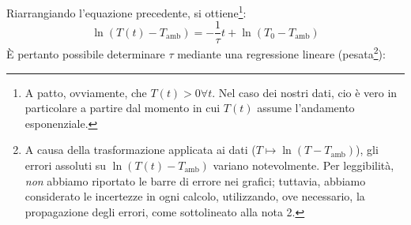 \documentclass{article}
\begin{document}
Riarrangiando l'equazione precedente, si ottiene\footnote{
    A patto, ovviamente, che $T(t) > 0 \forall t$.
    Nel caso dei nostri dati, cio è vero in particolare
    a partire dal momento in cui $T(t)$ assume l'andamento
    esponenziale.
}:
\[
    \ln(T(t) - T_\text{amb}) = -\frac{1}{\tau} t + \ln(T_0 - T_\text{amb})
\]
È pertanto possibile determinare $\tau$ mediante una regressione lineare (pesata\footnote{
    A causa della trasformazione applicata ai dati ($T \longmapsto \ln(T - T_\text{amb})$),
    gli errori assoluti su $\ln(T(t) - T_\text{amb})$ variano notevolmente. Per leggibilità,
    \emph{non} abbiamo riportato le barre di errore nei grafici; tuttavia, abbiamo
    considerato le incertezze in ogni calcolo, utilizzando, ove necessario, la propagazione
    degli errori, come sottolineato alla nota 2.
}):
\end{document}
